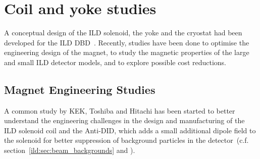 \section{Coil and yoke studies}

A conceptual design of the ILD solenoid, the yoke and the cryostat had been developed for the ILD DBD~\cite{ild:bib:Magnet_Note, ild:bib:Cryostat_Note}. Recently, studies have been done to optimise the engineering design of the magnet, to study the magnetic properties of the large and small ILD detector models, and to explore possible cost reductions.

\subsection{Magnet Engineering Studies}
A common study by KEK, Toshiba and Hitachi has been started to better understand the engineering challenges in the design and manufacturing of the ILD solenoid coil and the Anti-DID, which adds a small additional dipole field to the solenoid for better suppression of background particles in the detector~(c.f. section~\ref{ild:sec:beam_backgrounds} and \cite{ild:bib:anti-did}).

